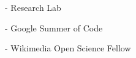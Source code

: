 
\begin{frame}{}

  - Research Lab

  - Google Summer of Code

  - Wikimedia Open Science Fellow

   
  
\end{frame}
